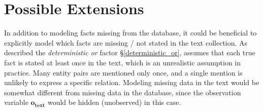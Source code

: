 \documentclass[12pt]{article}
\begin{document}
\section{Possible Extensions}
In addition to modeling facts missing from the database, it could be beneficial to explicitly model which facts are missing / not stated in the text collection.  
As described the \emph{deterministic or}
factor \S \ref{deterministic_or}, assumes that each true fact is stated at least once in the text, which is an unrealistic assumption in practice.  Many entity pairs are mentioned
only once, and a single mention is unlikely to express a specific relation.  Modeling missing data in the text would be somewhat different from missing data in the database, since
the observation variable $\mathbf{o_\text{text}}$ would be hidden (unobserved) in this case.


\end{document}
